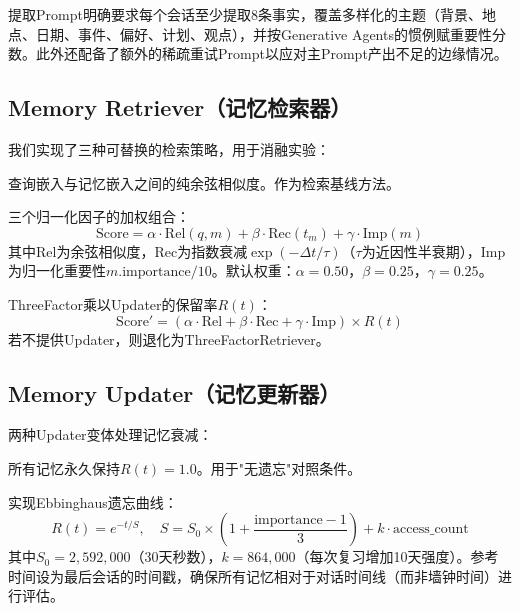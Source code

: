 \documentclass[11pt,a4paper]{ctexart}
\begin{document}
提取Prompt明确要求每个会话至少提取8条事实，覆盖多样化的主题（背景、地点、日期、事件、偏好、计划、观点），并按Generative Agents的惯例赋重要性分数。此外还配备了额外的稀疏重试Prompt以应对主Prompt产出不足的边缘情况。

\subsection{Memory Retriever（记忆检索器）}

我们实现了三种可替换的检索策略，用于消融实验：

\begin{description}[nosep]
    \item[DenseRetriever：] 查询嵌入与记忆嵌入之间的纯余弦相似度。作为检索基线方法。
    \item[ThreeFactorRetriever：] 三个归一化因子的加权组合：
    \begin{equation}
        \mathrm{Score} = \alpha \cdot \mathrm{Rel}(q, m) + \beta \cdot \mathrm{Rec}(t_m) + \gamma \cdot \mathrm{Imp}(m)
    \end{equation}
    其中Rel为余弦相似度，Rec为指数衰减$\exp(-\Delta t / \tau)$（$\tau$为近因性半衰期），Imp为归一化重要性$m.\mathrm{importance}/10$。默认权重：$\alpha{=}0.50$，$\beta{=}0.25$，$\gamma{=}0.25$。
    \item[ForgettingRetriever：] ThreeFactor乘以Updater的保留率$R(t)$：
    \begin{equation}
        \mathrm{Score}' = (\alpha \cdot \mathrm{Rel} + \beta \cdot \mathrm{Rec} + \gamma \cdot \mathrm{Imp}) \times R(t)
    \end{equation}
    若不提供Updater，则退化为ThreeFactorRetriever。
\end{description}

\subsection{Memory Updater（记忆更新器）}

两种Updater变体处理记忆衰减：

\begin{description}[nosep]
    \item[NoOpUpdater：] 所有记忆永久保持$R(t) = 1.0$。用于"无遗忘"对照条件。
    \item[EbbinghausUpdater：] 实现Ebbinghaus遗忘曲线：
    \begin{equation}
        R(t) = e^{-t / S},\quad S = S_0 \times \left(1 + \frac{\mathrm{importance} - 1}{3}\right) + k \cdot \mathrm{access\_count}
    \end{equation}
    其中$S_0 = 2,592,000$（30天秒数），$k = 864,000$（每次复习增加10天强度）。参考时间设为最后会话的时间戳，确保所有记忆相对于对话时间线（而非墙钟时间）进行评估。
\end{description}
\end{document}
